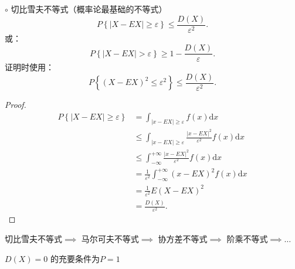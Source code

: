 $\circ$ 切比雪夫不等式（概率论最基础的不等式）
\[
    P\left\{ \left| X-EX \right| \ge \varepsilon \right\} \le \frac{D\left( X \right) }{\varepsilon^2}
.\]
或：
\[
    P\left\{ \left| X-EX \right| >\varepsilon \right\} \ge 1-\frac{D\left( X \right) }{\varepsilon}
.\] 
证明时使用： \[
    P\left\{ \left( X-EX \right) ^2\le \varepsilon^2 \right\} \le \frac{D\left( X \right) }{\varepsilon^2}
.\] 
\begin{proof}
    \begin{align*}
        P\left\{ \left| X-EX \right| \ge \varepsilon \right\} &= \int_{\left| x-EX \right| \ge \varepsilon} f\left( x \right)  \mathrm{d}x \\
        &\le  \int_{\left| x-EX \right| \ge \varepsilon}^{} \frac{\left| x-EX \right| ^2}{\varepsilon^2}f\left( x \right)  \mathrm{d}x \\
        &\le \int_{-\infty}^{+\infty} \frac{\left| x-EX \right| ^2}{\varepsilon^2}f\left( x \right)  \mathrm{d}x \\
        &= \frac{1}{\varepsilon^2}\int_{-\infty}^{+\infty} \left( x-EX \right) ^2f\left( x \right)  \mathrm{d}x \\
        &= \frac{1}{\varepsilon^2}E\left( X-EX \right) ^2 \\
        &= \frac{D\left( X \right) }{\varepsilon^2} 
    .\end{align*}
\end{proof}
\begin{notation}
    切比雪夫不等式$\implies$ 马尔可夫不等式$\implies$ 协方差不等式$\implies$ 阶乘不等式$\implies\ldots$

    $D\left( X \right) =0$ 的充要条件为$P=1$
\end{notation}




